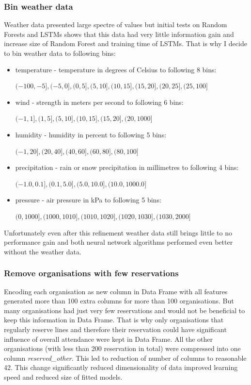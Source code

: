 \documentclass{article}
\begin{document}
\subsubsection{Bin weather data} \label{sec:bin_weather}
Weather data presented large spectre of values but initial tests on Random Forests and LSTMs shows that this data had very little information gain and increase size of Random Forest and training time of LSTMs. That is why I decide to bin weather data to following bins:
\begin{itemize}
    \item temperature - temperature in degrees of Celsius to following 8 bins:
    
    $(-100, -5], (-5,0], (0,5], (5,10], (10,15], (15,20], (20,25], (25, 100]$
    \item wind - strength in meters per second to following 6 bins:
    
    $(-1,1], (1,5], (5,10], (10,15], (15,20], (20, 1000]$
    \item humidity - humidity in percent to following 5 bins: 
    
    $(-1,20], (20,40], (40,60], (60,80], (80,100]$
    \item precipitation - rain or snow precipitation in millimetres to following 4 bins: 
    
    $(-1.0,0.1], (0.1,5.0], (5.0,10.0], (10.0,1000.0]$
    \item pressure - air pressure in kPa to following 5 bins: 
    
    $(0,1000], (1000,1010], (1010,1020], (1020,1030], (1030,2000]$
\end{itemize}

Unfortunately even after this refinement weather data still brings little to no performance gain and both neural network algorithms performed even better without the weather data. 

\subsubsection{Remove organisations with few reservations}
Encoding each organisation as new column in Data Frame with all features generated more than 100 extra columns for more than 100 organisations. But many organisations had just very few reservations and would not be beneficial to keep this information in Data Frame. That is why only organisations that regularly reserve lines and therefore their reservation could have significant influence of overall attendance were kept in Data Frame. All the other organisations (with less than 200 reservation in total) were compressed into one column \emph{reserved\_other}. This led to reduction of number of columns to reasonable 42. 
This change significantly reduced dimensionality of data improved learning speed and reduced size of fitted models. 
\end{document}
